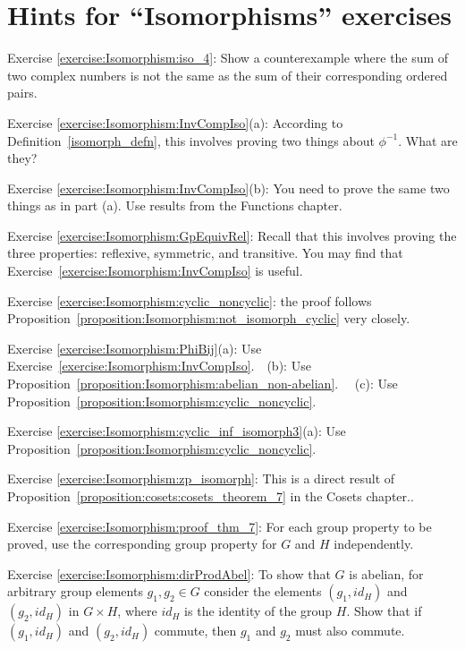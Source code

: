 \section{Hints for ``Isomorphisms'' exercises}
\label{sec:Isomorphism:Hints} 


\noindent Exercise \ref{exercise:Isomorphism:iso_4}:  Show a counterexample where the sum of two complex numbers is not the same as the sum of their corresponding ordered pairs.

\noindent Exercise \ref{exercise:Isomorphism:InvCompIso}(a):  According to Definition~\ref{isomorph_defn}, this involves proving two things about $\phi^{-1}$.  What are they?

\noindent Exercise \ref{exercise:Isomorphism:InvCompIso}(b): You need to prove the same two things as in part (a).  Use results from the Functions chapter.

\noindent Exercise \ref{exercise:Isomorphism:GpEquivRel}:   Recall that this involves proving the three properties: reflexive, symmetric, and transitive. You may find that Exercise~\ref{exercise:Isomorphism:InvCompIso}  is useful.

\noindent Exercise \ref{exercise:Isomorphism:cyclic_noncyclic}:   the proof follows Proposition~\ref{proposition:Isomorphism:not_isomorph_cyclic} very closely.

\noindent Exercise \ref{exercise:Isomorphism:PhiBij}(a): Use Exercise~\ref{exercise:Isomorphism:InvCompIso}.~~(b):  Use Proposition~\ref{proposition:Isomorphism:abelian_non-abelian}. ~~(c):  Use Proposition~\ref{proposition:Isomorphism:cyclic_noncyclic}. 

\noindent Exercise \ref{exercise:Isomorphism:cyclic_inf_isomorph3}(a): Use Proposition~\ref{proposition:Isomorphism:cyclic_noncyclic}.

\noindent Exercise \ref{exercise:Isomorphism:zp_isomorph}: This  is a direct result of Proposition~\ref{proposition:cosets:cosets_theorem_7} in the Cosets chapter..

\noindent Exercise \ref{exercise:Isomorphism:proof_thm_7}: For each group property to be proved, use the corresponding group property for $G$ and $H$ independently.

\noindent Exercise \ref{exercise:Isomorphism:dirProdAbel}: To show that $G$ is abelian, for arbitrary group elements $g_1, g_2 \in G$ consider the elements $(g_1, id_H)$ and $(g_2,id_H)$ in $G \times H$, where $id_H$ is the identity of the group $H$.  Show that if $(g_1, id_H)$ and $(g_2,id_H)$ commute, then $g_1$ and $g_2$ must also commute. 


